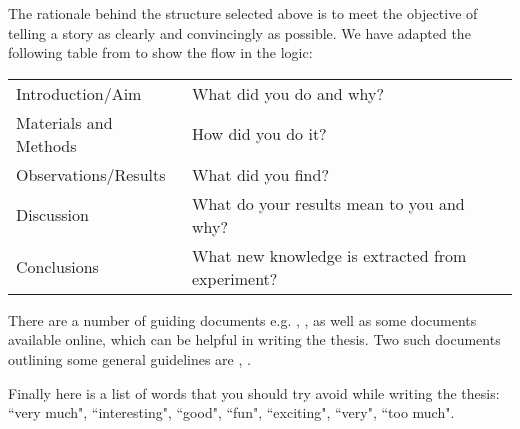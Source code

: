 The rationale behind the structure selected above is to meet the objective of telling a story as clearly and convincingly as possible. We have adapted the following table from \cite{barrass2002scientists} to show the flow in the logic:

\begin{table}[h]
\centering
\begin{tabular}{l|l} \hline
Introduction/Aim  & What did you do and why? \\
Materials and Methods & How did you do it? \\
Observations/Results & What did you find? \\
Discussion & What do your results mean to you and why? \\
Conclusions & What new knowledge is extracted from experiment? \\ \hline
\end{tabular}
\label{tab:logic_flow}
\end{table}


There are a number of guiding documents e.g. \cite{murray2006write}, \cite{evans2003write}, as well as some documents available online, which can be helpful in writing the thesis. Two such documents outlining some general guidelines are \cite{howtothesis}, \cite{getthesis}.

Finally here is a list of words that you should try avoid while writing the thesis: ``very much", ``interesting", ``good", ``fun", ``exciting", ``very", ``too much".




